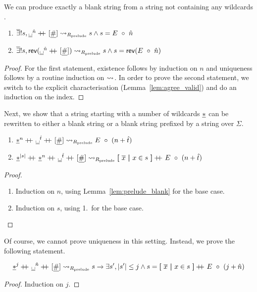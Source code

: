 \begin{lemma}\label{lem:prelude_blank}\leavevmode
  We can produce exactly a blank string from a string not containing any wildcards \nstar.
  \begin{enumerate}
    \item $\mexists s, \nblank^{\hat{n}} \concat [\ndelim] \strent{\Rprelude} s \land s = \nilstr{\circ}{\hat{n}}$
    \item $\mexists s, \rev (\nblank^{\hat{n}} \concat [\ndelim]) \strent{\Rprelude} s \land s = \rev(\nilstr{\circ}{\hat{n}})$
  \end{enumerate}
\end{lemma}
\begin{proof}
  For the first statement, existence follows by induction on $n$ and uniqueness follows by a routine induction on $\rightsquigarrow_{}$. 
  In order to prove the second statement, we switch to the explicit characterisation (Lemma~\ref{lem:agree_valid}) and do an induction on the index.
\end{proof}

Next, we show that a string starting with a number of wildcards $\underline{*}$ can be rewritten to either a blank string or a blank string prefixed by a string over $\Sigma$.
\begin{lemma}\leavevmode
  \begin{enumerate}
    \item $\nstar^{n} \concat \nblank^{\hat{t}} \concat [\ndelim] \strent{\Rprelude} \nilstr{\circ}{(n + \hat{t})}$
    \item $\nstar^{\length{s}} \concat \nstar^n \concat \nblank^{\hat{t}} \concat [\ndelim] \strent{\Rprelude} \withl \overline{x} \withm x \in s\withr \concat \nilstr{\circ}{(n+\hat{t})}$
  \end{enumerate}
\end{lemma}
\begin{proof}
  \begin{enumerate}
    \item Induction on $n$, using Lemma~\ref{lem:prelude_blank} for the base case.
    \item Induction on $s$, using 1.\ for the base case.
  \end{enumerate}
\end{proof}

Of course, we cannot prove uniqueness in this setting. Instead, we prove the following statement.
\begin{lemma}
  \[ \nstar^j \concat \nblank^{\hat{n}} \concat [\ndelim] \strent{\Rprelude} s \rightarrow \exists s', \length{s'} \le j \land s = \withl \overline{x} \withm x \in s \withr \concat \nilstr{\circ}{(j + \hat{n})} \]
\end{lemma}
\begin{proof}
  Induction on $j$.
\end{proof}

